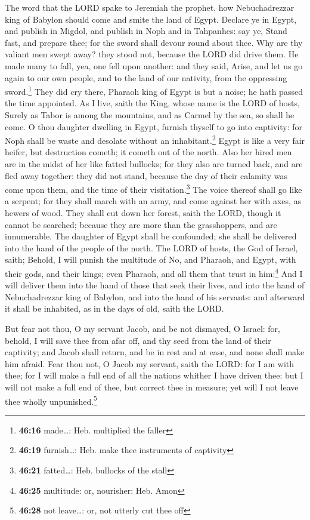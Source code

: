  The word that the LORD spake to Jeremiah the prophet,
how Nebuchadrezzar king of Babylon should come and smite the land of
Egypt.  Declare ye in Egypt, and publish in Migdol, and
publish in Noph and in Tahpanhes: say ye, Stand fast, and prepare thee;
for the sword shall devour round about thee.  Why are thy
valiant men swept away? they stood not, because the LORD did drive them.
 He made many to fall, yea, one fell upon another: and
they said, Arise, and let us go again to our own people, and to the land
of our nativity, from the oppressing sword.\footnote{\textbf{46:16}
  made\ldots: Heb. multiplied the faller}  They did cry
there, Pharaoh king of Egypt is but a noise; he hath passed the time
appointed.  As I live, saith the King, whose name is the
LORD of hosts, Surely as Tabor is among the mountains, and as Carmel by
the sea, so shall he come.  O thou daughter dwelling in
Egypt, furnish thyself to go into captivity: for Noph shall be waste and
desolate without an inhabitant.\footnote{\textbf{46:19} furnish\ldots:
  Heb. make thee instruments of captivity}  Egypt is like
a very fair heifer, but destruction cometh; it cometh out of the north.
 Also her hired men are in the midst of her like fatted
bullocks; for they also are turned back, and are fled away together:
they did not stand, because the day of their calamity was come upon
them, and the time of their visitation.\footnote{\textbf{46:21}
  fatted\ldots: Heb. bullocks of the stall}  The voice
thereof shall go like a serpent; for they shall march with an army, and
come against her with axes, as hewers of wood.  They
shall cut down her forest, saith the LORD, though it cannot be searched;
because they are more than the grasshoppers, and are innumerable.
 The daughter of Egypt shall be confounded; she shall be
delivered into the hand of the people of the north.  The
LORD of hosts, the God of Israel, saith; Behold, I will punish the
multitude of No, and Pharaoh, and Egypt, with their gods, and their
kings; even Pharaoh, and all them that trust in him:\footnote{\textbf{46:25}
  multitude: or, nourisher: Heb. Amon}  And I will
deliver them into the hand of those that seek their lives, and into the
hand of Nebuchadrezzar king of Babylon, and into the hand of his
servants: and afterward it shall be inhabited, as in the days of old,
saith the LORD.

 But fear not thou, O my servant Jacob, and be not
dismayed, O Israel: for, behold, I will save thee from afar off, and thy
seed from the land of their captivity; and Jacob shall return, and be in
rest and at ease, and none shall make him afraid.  Fear
thou not, O Jacob my servant, saith the LORD: for I am with thee; for I
will make a full end of all the nations whither I have driven thee: but
I will not make a full end of thee, but correct thee in measure; yet
will I not leave thee wholly unpunished.\footnote{\textbf{46:28} not
  leave\ldots: or, not utterly cut thee off}

